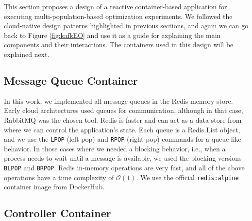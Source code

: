 \documentclass[review]{elsarticle}
\begin{document}


This section proposes a design of a reactive container-based application 
for executing multi-population-based optimization experiments. We followed the
cloud-native design patterns highlighted in previous sections, and again
we can go back to Figure \ref{fig:kafkEO} and use it as a guide for explaining
the main components and their interactions. 
The containers used in this design will be explained next. 

\subsection{Message Queue Container} 
\label{message_container}

In this work, we implemented all message
queues in the Redis memory store. Early cloud architectures
\cite{de2017parallel} used queues for communication, although in that
case, RabbitMQ was the chosen tool. Redis is faster and can act as a 
data store from where we can control the application's state. 
Each queue is a Redis List object, and we use
the \texttt{LPOP} (left pop) and \texttt{RPOP} (right pop) commands for a queue like behavior.
In those cases where we needed a blocking behavior, i.e., when a process needs
to wait until a message is available, we used the blocking versions \texttt{BLPOP} and
\texttt{BRPOP}. Redis in-memory operations are very fast, and all of the above 
operations have a time complexity of $\mathcal{O}(1)$. We use the official 
\texttt{redis:alpine} container image from DockerHub.  

\subsection{Controller Container} 
\label{controller}
\end{document}
